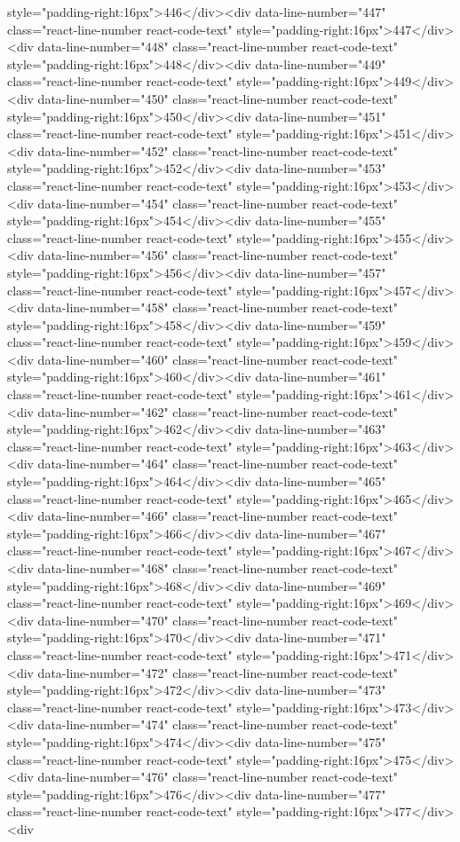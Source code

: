 {{{{{{{style="padding-right:16px">446</div><div data-line-number="447" class="react-line-number react-code-text" style="padding-right:16px">447</div><div data-line-number="448" class="react-line-number react-code-text" style="padding-right:16px">448</div><div data-line-number="449" class="react-line-number react-code-text" style="padding-right:16px">449</div><div data-line-number="450" class="react-line-number react-code-text" style="padding-right:16px">450</div><div data-line-number="451" class="react-line-number react-code-text" style="padding-right:16px">451</div><div data-line-number="452" class="react-line-number react-code-text" style="padding-right:16px">452</div><div data-line-number="453" class="react-line-number react-code-text" style="padding-right:16px">453</div><div data-line-number="454" class="react-line-number react-code-text" style="padding-right:16px">454</div><div data-line-number="455" class="react-line-number react-code-text" style="padding-right:16px">455</div><div data-line-number="456" class="react-line-number react-code-text" style="padding-right:16px">456</div><div data-line-number="457" class="react-line-number react-code-text" style="padding-right:16px">457</div><div data-line-number="458" class="react-line-number react-code-text" style="padding-right:16px">458</div><div data-line-number="459" class="react-line-number react-code-text" style="padding-right:16px">459</div><div data-line-number="460" class="react-line-number react-code-text" style="padding-right:16px">460</div><div data-line-number="461" class="react-line-number react-code-text" style="padding-right:16px">461</div><div data-line-number="462" class="react-line-number react-code-text" style="padding-right:16px">462</div><div data-line-number="463" class="react-line-number react-code-text" style="padding-right:16px">463</div><div data-line-number="464" class="react-line-number react-code-text" style="padding-right:16px">464</div><div data-line-number="465" class="react-line-number react-code-text" style="padding-right:16px">465</div><div data-line-number="466" class="react-line-number react-code-text" style="padding-right:16px">466</div><div data-line-number="467" class="react-line-number react-code-text" style="padding-right:16px">467</div><div data-line-number="468" class="react-line-number react-code-text" style="padding-right:16px">468</div><div data-line-number="469" class="react-line-number react-code-text" style="padding-right:16px">469</div><div data-line-number="470" class="react-line-number react-code-text" style="padding-right:16px">470</div><div data-line-number="471" class="react-line-number react-code-text" style="padding-right:16px">471</div><div data-line-number="472" class="react-line-number react-code-text" style="padding-right:16px">472</div><div data-line-number="473" class="react-line-number react-code-text" style="padding-right:16px">473</div><div data-line-number="474" class="react-line-number react-code-text" style="padding-right:16px">474</div><div data-line-number="475" class="react-line-number react-code-text" style="padding-right:16px">475</div><div data-line-number="476" class="react-line-number react-code-text" style="padding-right:16px">476</div><div data-line-number="477" class="react-line-number react-code-text" style="padding-right:16px">477</div><div }}}}}}}
